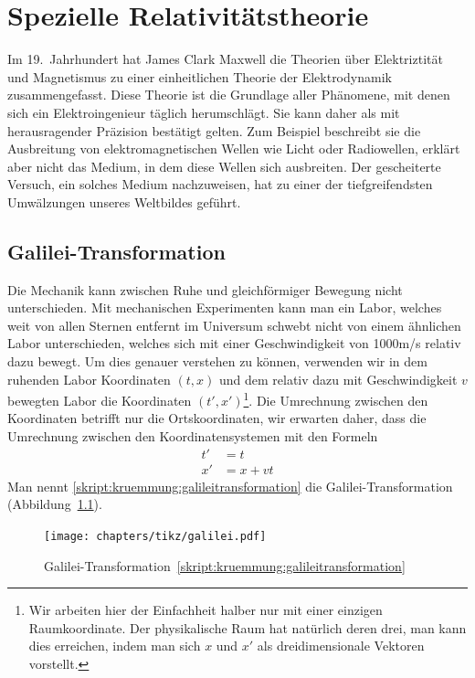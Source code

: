 %
%
%

\chapter{Spezielle Relativitätstheorie%
\label{skript:chapter:spezielle}}
\rhead{}
Im 19.~Jahrhundert hat James Clark Maxwell die Theorien
über Elektriztität und Magnetismus zu einer einheitlichen Theorie
der Elektrodynamik zusammengefasst.
Diese Theorie ist die Grundlage aller Phänomene, mit denen sich
ein Elektroingenieur täglich herumschlägt.
Sie kann daher als mit herausragender Präzision bestätigt gelten.
Zum Beispiel beschreibt sie die Ausbreitung von elektromagnetischen
Wellen wie Licht oder Radiowellen, erklärt aber nicht das Medium, in
dem diese Wellen sich ausbreiten.
Der gescheiterte Versuch, ein solches Medium nachzuweisen, hat zu einer
der tiefgreifendsten Umwälzungen unseres Weltbildes geführt.

\section{Galilei-Transformation}
Die Mechanik kann zwischen Ruhe und gleichförmiger Bewegung nicht 
unterschieden.
Mit mechanischen Experimenten kann man ein Labor, welches weit von
allen Sternen entfernt im Universum schwebt nicht von einem ähnlichen
Labor unterschieden, welches sich mit einer Geschwindigkeit von 1000m/s
relativ dazu bewegt.
Um dies genauer verstehen zu können, verwenden wir in dem ruhenden Labor
Koordinaten $(t,x)$ und dem relativ dazu mit Geschwindigkeit $v$ bewegten
Labor die Koordinaten
$(t',x')$\footnote{Wir arbeiten hier der Einfachheit halber nur mit einer
einzigen Raumkoordinate.
Der physikalische Raum hat natürlich deren drei, man kann dies erreichen,
indem man sich $x$ und $x'$ als dreidimensionale Vektoren vorstellt.}.
Die Umrechnung zwischen den Koordinaten betrifft nur die Ortskoordinaten,
wir erwarten daher, dass die Umrechnung zwischen den Koordinatensystemen
mit den Formeln
\begin{equation}
\begin{aligned}
t'&=t\\
x'&=x+vt
\end{aligned}
\label{skript:kruemmung:galileitransformation}
\end{equation}
Man nennt \eqref{skript:kruemmung:galileitransformation} die
Galilei-Transformation (Abbildung~\ref{skript:spezielle:galileigraphik}).
\begin{figure}
\centering
\texttt{[image: chapters/tikz/galilei.pdf]}
\caption{Galilei-Transformation~\eqref{skript:kruemmung:galileitransformation}
\label{skript:spezielle:galileigraphik}}
\end{figure}

